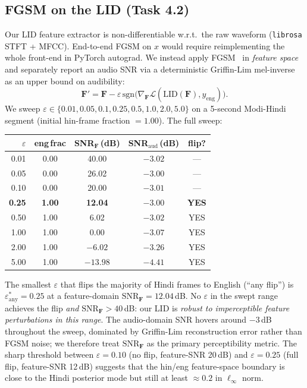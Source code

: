 \documentclass[conference]{IEEEtran}
\begin{document}
\subsection{FGSM on the LID (Task 4.2)}
Our LID feature extractor is non-differentiable w.r.t.\ the raw waveform
(\texttt{librosa} STFT + MFCC). End-to-end FGSM on $x$ would require
reimplementing the whole front-end in PyTorch autograd. We instead apply
FGSM~\cite{goodfellow} in \emph{feature space} and separately report an audio
SNR via a deterministic Griffin-Lim mel-inverse as an upper bound on
audibility:
\[
\mathbf{F}' = \mathbf{F}
    - \varepsilon\,\mathrm{sgn}\!\big(\nabla_{\mathbf{F}}
        \mathcal{L}(\mathrm{LID}(\mathbf{F}), y_{\mathrm{eng}})\big).
\]
We sweep $\varepsilon \in \{0.01, 0.05, 0.1, 0.25, 0.5, 1.0, 2.0, 5.0\}$
on a 5-second Modi-Hindi segment (initial hin-frame fraction $= 1.00$).
The full sweep:

\begin{center}
\scriptsize
\setlength{\tabcolsep}{4pt}
\begin{tabular}{@{}r c c c c@{}}
\toprule
\textbf{$\varepsilon$} & \textbf{eng\,frac} & \textbf{SNR$_\mathbf{F}$\,(dB)} & \textbf{SNR$_{\text{aud}}$\,(dB)} & \textbf{flip?} \\
\midrule
0.01 & 0.00 & 40.00 & $-3.02$ & — \\
0.05 & 0.00 & 26.02 & $-3.00$ & — \\
0.10 & 0.00 & 20.00 & $-3.01$ & — \\
\textbf{0.25} & \textbf{1.00} & \textbf{12.04} & $-3.00$ & \textbf{YES} \\
0.50 & 1.00 &  6.02 & $-3.02$ & YES \\
1.00 & 1.00 &  0.00 & $-3.07$ & YES \\
2.00 & 1.00 & $-6.02$ & $-3.26$ & YES \\
5.00 & 1.00 & $-13.98$ & $-4.41$ & YES \\
\bottomrule
\end{tabular}
\end{center}

\noindent The smallest $\varepsilon$ that flips the majority of Hindi
frames to English (``any flip'') is
$\varepsilon^{*}_{\mathrm{any}}=\mathbf{0.25}$ at a feature-domain
$\mathrm{SNR}_{\mathbf F} = 12.04$\,dB. No $\varepsilon$ in the swept
range achieves the flip \emph{and} $\mathrm{SNR}_{\mathbf F} > 40$\,dB:
our LID is \emph{robust to imperceptible feature perturbations in this
range}. The audio-domain SNR hovers around $-3$\,dB throughout the
sweep, dominated by Griffin-Lim reconstruction error rather than FGSM
noise; we therefore treat $\mathrm{SNR}_{\mathbf F}$ as the primary
perceptibility metric. The sharp threshold between $\varepsilon=0.10$
(no flip, feature-SNR 20\,dB) and $\varepsilon=0.25$ (full flip,
feature-SNR 12\,dB) suggests that the hin/eng feature-space boundary
is close to the Hindi posterior mode but still at least
$\approx 0.2$ in $\ell_\infty$ norm.
\end{document}
